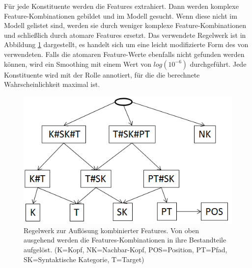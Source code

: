 \documentclass[12pt]{article}
\begin{document}
Für jede Konstituente werden die Features extrahiert. Dann werden komplexe Feature-Kombinationen gebildet und im Modell gesucht. Wenn diese nicht im Modell gelistet sind, werden sie durch weniger komplexe Feature-Kombinationen und schließlich durch atomare Features ersetzt. Das verwendete Regelwerk ist in Abbildung \ref{back_off_model} dargestellt, es handelt sich um eine leicht modifizierte Form des von \cite{gildea} verwendeten. Falls die atomaren Feature-Werte ebenfalls nicht gefunden werden können, wird ein Smoothing mit einem Wert von $log(10^{-6})$ durchgeführt. Jede Konstituente wird mit der Rolle annotiert, für die die berechnete Wahrscheinlichkeit maximal ist.

	\begin{figure}[tb!]
		\centering
		\includegraphics[scale=0.6]{images/backoff.png}
		\caption[Regelwerk zur Auflösung kombinierter Features]{Regelwerk zur Auflösung kombinierter Features. Von oben ausgehend werden die Features-Kombinationen in ihre Bestandteile aufgelöst. (K=Kopf, NK=Nachbar-Kopf, POS=Position, PT=Pfad, SK=Syntaktische Kategorie, T=Target)}
		\label{back_off_model}
	\end{figure}

\end{document}
